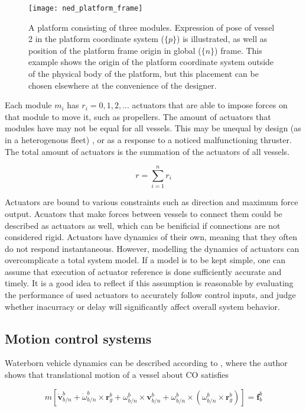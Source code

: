 \begin{figure}[h!]
	\centering
	\texttt{[image: ned\_platform\_frame]}
	\caption{A platform consisting of three modules. Expression of pose of vessel 2 in the platform coordinate system ($ \{p\}$) is illustrated, as well as position of the platform frame origin in global ($ \{n\}$) frame. This example shows the origin of the platform coordinate system outside of the physical body of the platform, but this placement can be chosen elsewhere at the convenience of the designer.}
	\label{fig:bartned_platform_frame}
\end{figure}

Each module $m_i$ has $r_i = 0,1,2,...$ actuators that are able to impose forces on that module to move it, such as propellers. The amount of actuators that modules have may not be equal for all vessels. This may be unequal by design (as in a heterogenous fleet) , or as a response to a noticed malfunctioning thruster. The total amount of actuators is the summation of the actuators of all vessels.

\begin{equation} 
r =\sum_{i=1}^{n} r_i
\end{equation}

Actuators are bound to various constraints such as direction and maximum force output. Acuators that make forces between vessels to connect them could be described as actuators as well, which can be benificial if connections are not considered rigid. Actuators have dynamics of their own, meaning that they often do not respond instantaneous. However, modelling the dynamics of actuators can  overcomplicate a total system model. If a model is to be kept simple, one can assume that execution of actuator reference is done sufficiently accurate and timely. It is a good idea to reflect if this assumption is reasonable by evaluating the performance of used actuators to accurately follow control inputs, and judge whether inacurracy or delay will significantly affect overall system behavior. 

\subsection{Motion control systems}
Waterborn vehicle dynamics can be described according to \citet{fossen2011handbook}, where the author shows that translational motion of a vessel about CO satisfies

\begin{equation}
m [ \dot{\textbf{v}}_{b/n}^{b} + \dot{\omega}_{b/n}^{b}  \times \textbf{r}_g^b     + \omega_{b/n}^{b}  \times  \textbf{v}_{b/n}^{b} +  \omega_{b/n}^{b}  \times ( \omega_{b/n}^{b}  \times \textbf{r}_g^b   ) ] = \textbf{f}_b^b
\label{eq:fossen2011TranslationalMotionAboutCO-eqnumber-3-33}
\end{equation}

